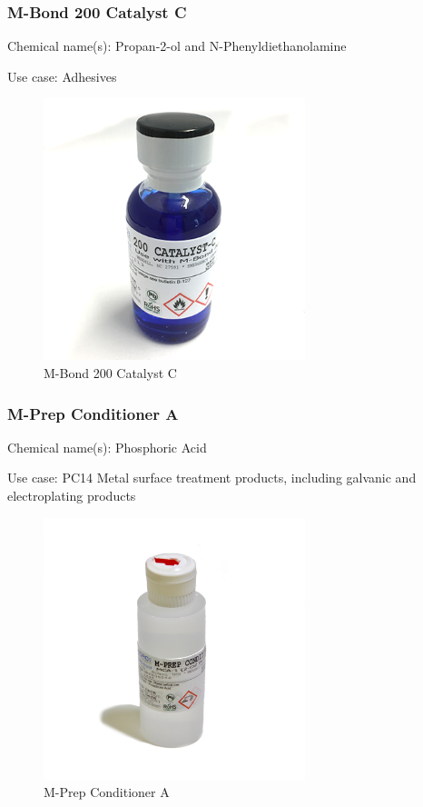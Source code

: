 \subsubsection{M-Bond 200 Catalyst C}
Chemical name(s): Propan-2-ol and N-Phenyldiethanolamine

\vspace{1em}

Use case: Adhesives
\begin{figure}[H]
        \centering
        \includegraphics[width=3in]{images/Strain Gauge/M-Bond 200 Catalyst C.png}
        \caption{M-Bond 200 Catalyst C}
        \label{fig:M-Bond 200 Catalyst C}
\end{figure}

\subsubsection{M-Prep Conditioner A}
Chemical name(s): Phosphoric Acid

\vspace{1em}

Use case: PC14 Metal surface treatment products, including galvanic and electroplating products

\begin{figure}[H]
        \centering
        \includegraphics[width=3in]{images/Strain Gauge/M-Prep Conditioner A.jpg}
        \caption{M-Prep Conditioner A}
        \label{fig:M-Prep Conditioner A}
\end{figure}

